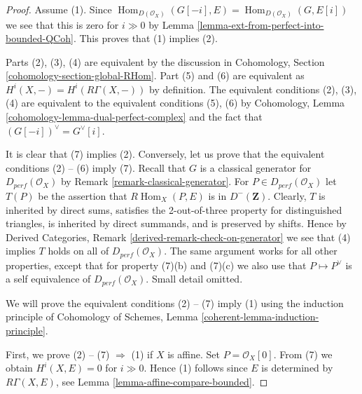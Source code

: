 \documentclass{amsart}
\theoremstyle{plain}
\theoremstyle{definition}
\theoremstyle{remark}
\numberwithin{equation}{subsection}
\def\Hom{\mathop{\mathrm{Hom}}\nolimits}
\begin{document}
\begin{proof}
Assume (1). Since
$\Hom_{D(\mathcal{O}_X)}(G[-i], E) = \Hom_{D(\mathcal{O}_X)}(G, E[i])$
we see that this is zero for $i \gg 0$ by
Lemma \ref{lemma-ext-from-perfect-into-bounded-QCoh}. This proves
that (1) implies (2).

\medskip\noindent
Parts (2), (3), (4) are equivalent by the discussion in
Cohomology, Section \ref{cohomology-section-global-RHom}.
Part (5) and (6) are equivalent as $H^i(X, -) = H^i(R\Gamma(X, -))$
by definition. The equivalent conditions (2), (3), (4) are
equivalent to the equivalent conditions (5), (6) by
Cohomology, Lemma \ref{cohomology-lemma-dual-perfect-complex}
and the fact that $(G[-i])^\vee = G^\vee[i]$.

\medskip\noindent
It is clear that (7) implies (2). Conversely, 
let us prove that the equivalent conditions (2) -- (6) imply (7).
Recall that $G$ is a  classical generator for $D_{perf}(\mathcal{O}_X)$ by
Remark \ref{remark-classical-generator}.
For $P \in D_{perf}(\mathcal{O}_X)$ let $T(P)$ be the assertion that
$R\Hom_X(P, E)$ is in $D^-(\mathbf{Z})$.
Clearly, $T$ is inherited by direct sums,
satisfies the 2-out-of-three property for distinguished
triangles, is inherited by direct summands, and is preserved by shifts.
Hence by Derived Categories, Remark \ref{derived-remark-check-on-generator}
we see that (4) implies $T$ holds on all of $D_{perf}(\mathcal{O}_X)$.
The same argument works for all other properties, except that for property
(7)(b) and (7)(c) we also use that $P \mapsto P^\vee$ is a self
equivalence of $D_{perf}(\mathcal{O}_X)$. Small detail omitted.

\medskip\noindent
We will prove the equivalent conditions (2) -- (7) imply (1)
using the induction principle of
Cohomology of Schemes, Lemma \ref{coherent-lemma-induction-principle}.

\medskip\noindent
First, we prove (2) -- (7) $\Rightarrow$ (1) if $X$ is affine.
Set $P = \mathcal{O}_X[0]$. From (7) we obtain $H^i (X, E) = 0$ for $i \gg 0$.
Hence (1) follows since $E$ is determined by $R\Gamma (X, E)$,
see Lemma \ref{lemma-affine-compare-bounded}.


\end{proof}
\end{document}
